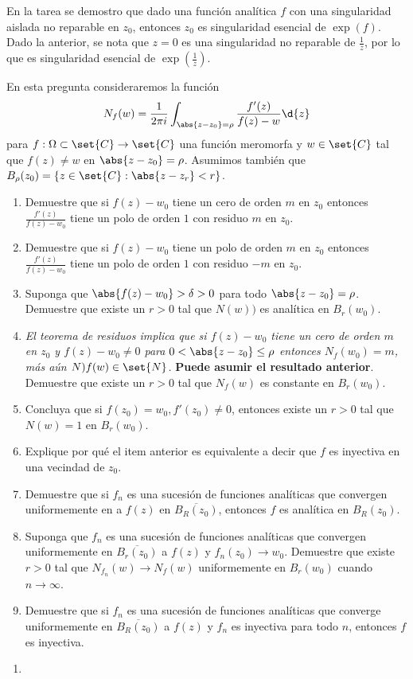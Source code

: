 \documentclass{homework}
\begin{document}
\begin{sol}
    En la tarea se demostro que dado una función analítica \(f\) con una singularidad aislada no reparable en \(z_0\), entonces \(z_0\) es singularidad esencial de \(\exp(f)\). Dado la anterior, se nota que \(z=0\) es una singularidad no reparable de \(\frac1z\), por lo que es singularidad esencial de \(\exp(\frac1z)\).
\end{sol}

\begin{prob}
    En esta pregunta consideraremos la función
    \begin{equation}
        N_f(w)=\frac1{2\pi i}\int_{\abs{z-z_0}=\rho}\frac{f'(z)}{f(z)-w}\d{z}\label{func}
    \end{equation}
    para \(f:\Omega\subset\set{C}\rightarrow\set{C}\) una función meromorfa y \(w\in\set{C}\) tal que \(f(z)\neq w\) en \(\abs{z-z_0}=\rho\). Asumimos también que \(B_\rho(z_0)=\{z\in\set{C}:\abs{z-z_r}<r\}\).
    \begin{enumerate}
        \item Demuestre que si \(f(z)-w_0\) tiene un cero de orden \(m\) en \(z_0\) entonces \(\frac{f'(z)}{f(z)-w_0}\) tiene un polo de orden \(1\) con residuo \(m\) en \(z_0\).
        \item Demuestre que si \(f(z)-w_0\) tiene un polo de orden \(m\) en \(z_0\) entonces \(\frac{f'(z)}{f(z)-w_0}\) tiene un polo de orden \(1\) con residuo \(-m\) en \(z_0\).
        \item Suponga que \(\abs{f(z)-w_0}>\delta>0\) para todo \(\abs{z-z_0}=\rho\). Demuestre que existe un \(r>0\) tal que \(N(w))\) es analítica en \(B_r(w_0)\).
        \item \textit{El teorema de residuos implica que si \(f(z)-w_0\) tiene un cero de orden \(m\) en \(z_0\) y \(f(z)-w_0\neq0\) para \(0<\abs{z-z_0}\leq\rho\) entonces \(N_f(w_0)=m\), más aún \(N)f(w)\in\set{N}\).} \textbf{Puede asumir el resultado anterior}. Demuestre que existe un \(r>0\) tal que \(N_f(w)\) es constante en \(B_r(w_0)\).
        \item Concluya que si \(f(z_0)=w_0,f'(z_0)\neq0\), entonces existe un \(r>0\) tal que \(N(w)=1\) en \(B_r(w_0)\).
        \item Explique por qué el item anterior es equivalente a decir que \(f\) es inyectiva en una vecindad de \(z_0\).
        \item Demuestre que si \(f_n\) es una sucesión de funciones analíticas que convergen uniformemente en a \(f(z)\) en \(\overline{B_R(z_0)}\), entonces \(f\) es analítica en \(B_R(z_0)\).
        \item Suponga que \(f_n\) es una sucesión de funciones analíticas que convergen uniformemente en \(\overline{B_r(z_0)}\) a \(f(z)\) y \(f_n(z_0)\rightarrow w_0\). Demuestre que existe \(r>0\) tal que \(N_{f_n}(w)\rightarrow N_f(w)\) uniformemente en \(B_r(w_0)\) cuando \(n\rightarrow\infty\).
        \item Demuestre que si \(f_n\) es una sucesión de funciones analíticas que converge uniformemente en \(\overline{B_R(z_0)}\) a \(f(z)\) y \(f_n\) es inyectiva para todo \(n\), entonces \(f\) es inyectiva.
    \end{enumerate}
\end{prob}

\begin{sol}
    \begin{enumerate}
        \item 
    \end{enumerate}
\end{sol}
\end{document}
